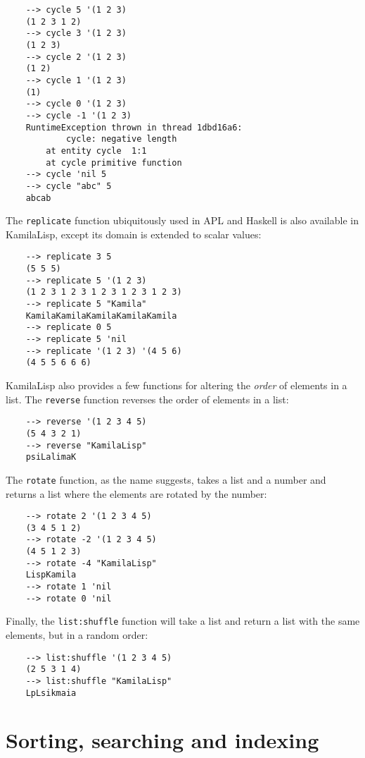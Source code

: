 \begin{Verbatim}
    --> cycle 5 '(1 2 3)
    (1 2 3 1 2)
    --> cycle 3 '(1 2 3)
    (1 2 3)
    --> cycle 2 '(1 2 3)
    (1 2)
    --> cycle 1 '(1 2 3)
    (1)
    --> cycle 0 '(1 2 3)
    --> cycle -1 '(1 2 3)
    RuntimeException thrown in thread 1dbd16a6:
            cycle: negative length
        at entity cycle  1:1
        at cycle primitive function
    --> cycle 'nil 5
    --> cycle "abc" 5
    abcab
\end{Verbatim}

The \verb|replicate| function ubiquitously used in APL and Haskell is also available in KamilaLisp, except its domain is extended to scalar values:

\begin{Verbatim}
    --> replicate 3 5
    (5 5 5)
    --> replicate 5 '(1 2 3)
    (1 2 3 1 2 3 1 2 3 1 2 3 1 2 3)
    --> replicate 5 "Kamila"
    KamilaKamilaKamilaKamilaKamila
    --> replicate 0 5
    --> replicate 5 'nil
    --> replicate '(1 2 3) '(4 5 6)
    (4 5 5 6 6 6)
\end{Verbatim}

KamilaLisp also provides a few functions for altering the \textit{order} of elements in a list. The \verb|reverse| function reverses the order of elements in a list:

\begin{Verbatim}
    --> reverse '(1 2 3 4 5)
    (5 4 3 2 1)
    --> reverse "KamilaLisp"
    psiLalimaK
\end{Verbatim}

The \verb|rotate| function, as the name suggests, takes a list and a number and returns a list where the elements are rotated by the number:

\begin{Verbatim}
    --> rotate 2 '(1 2 3 4 5)
    (3 4 5 1 2)
    --> rotate -2 '(1 2 3 4 5)
    (4 5 1 2 3)
    --> rotate -4 "KamilaLisp"
    LispKamila
    --> rotate 1 'nil
    --> rotate 0 'nil
\end{Verbatim}

Finally, the \verb|list:shuffle| function will take a list and return a list with the same elements, but in a random order:

\begin{Verbatim}
    --> list:shuffle '(1 2 3 4 5)
    (2 5 3 1 4)
    --> list:shuffle "KamilaLisp"
    LpLsikmaia
\end{Verbatim}

\section{Sorting, searching and indexing}

